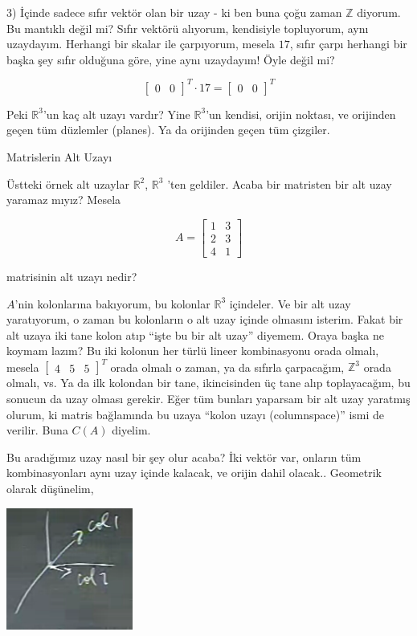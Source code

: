 \documentclass[12pt,fleqn]{article}\usepackage{../../common}
\begin{document}
3) İçinde sadece sıfır vektör olan bir uzay - ki ben buna çoğu zaman
$\mathbb{Z}$ diyorum. Bu mantıklı değil mi? Sıfır vektörü alıyorum,
kendisiyle topluyorum, aynı uzaydayım. Herhangi bir skalar ile çarpıyorum,
mesela $17$, sıfır çarpı herhangi bir başka şey sıfır olduğuna göre, yine
aynı uzaydayım! Öyle değil mi?

$$
\left[\begin{array}{cc} 0 & 0 \end{array}\right]^T \cdot 17 =
\left[\begin{array}{cc} 0 & 0 \end{array}\right]^T
$$

Peki $\mathbb{R}^3$'un kaç alt uzayı vardır? Yine $\mathbb{R}^3$'un
kendisi, orijin noktası, ve orijinden geçen tüm düzlemler (planes). Ya da
orijinden geçen tüm çizgiler. 

Matrislerin Alt Uzayı

Üstteki örnek alt uzaylar $\mathbb{R}^2$, $\mathbb{R}^3$ 'ten
geldiler. Acaba bir matristen bir alt uzay yaramaz mıyız? Mesela 

$$
A =
\left[\begin{array}{cc}
1 & 3 \\
2 & 3 \\
4 & 1 
\end{array}\right]
$$

matrisinin alt uzayı nedir? 

$A$'nin kolonlarına bakıyorum, bu kolonlar $\mathbb{R}^3$ içindeler. Ve bir
alt uzay yaratıyorum, o zaman bu kolonların o alt uzay içinde olmasını
isterim. Fakat bir alt uzaya iki tane kolon atıp ``işte bu bir alt uzay''
diyemem. Oraya başka ne koymam lazım? Bu iki kolonun her türlü lineer
kombinasyonu orada olmalı, mesela $\left[\begin{array}{ccc} 4 & 5 & 5\end{array}\right]^T$ 
orada olmalı o zaman, ya da sıfırla çarpacağım, $\mathbb{Z}^3$ orada olmalı, vs. Ya da ilk 
kolondan bir tane, ikincisinden üç tane alıp toplayacağım, bu sonucun da uzay
olması gerekir. Eğer tüm bunları yaparsam bir alt uzay yaratmış olurum, ki
matris bağlamında bu uzaya ``kolon uzayı (columnspace)'' ismi de verilir. Buna
$C(A)$ diyelim.

Bu aradığımız uzay nasıl bir şey olur acaba? İki vektör var, onların tüm
kombinasyonları aynı uzay içinde kalacak, ve orijin dahil
olacak.. Geometrik olarak düşünelim,

\includegraphics[height=4cm]{5_05.png}
\end{document}
